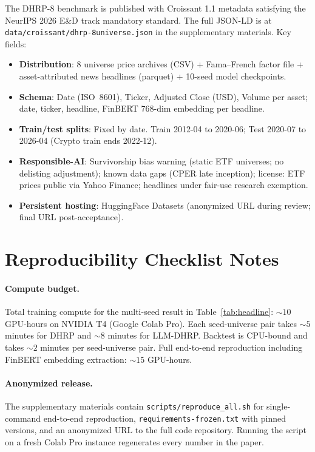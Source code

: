 The DHRP-8 benchmark is published with Croissant 1.1 metadata
\citep{Akhtar2024Croissant} satisfying the NeurIPS 2026 E\&D track
mandatory standard. The full JSON-LD is at
\texttt{data/croissant/dhrp-8universe.json} in the supplementary
materials. Key fields:
\begin{itemize}\itemsep0.05em
  \item \textbf{Distribution}: 8 universe price archives (CSV) +
    Fama--French factor file + asset-attributed news headlines
    (parquet) + 10-seed model checkpoints.
  \item \textbf{Schema}: Date (ISO~8601), Ticker, Adjusted Close (USD),
    Volume per asset; date, ticker, headline, FinBERT 768-dim
    embedding per headline.
  \item \textbf{Train/test splits}: Fixed by date. Train 2012-04 to
    2020-06; Test 2020-07 to 2026-04 (Crypto train ends 2022-12).
  \item \textbf{Responsible-AI}: Survivorship bias warning (static ETF
    universes; no delisting adjustment); known data gaps (CPER late
    inception); license: ETF prices public via Yahoo Finance;
    headlines under fair-use research exemption.
  \item \textbf{Persistent hosting}: HuggingFace Datasets
    (anonymized URL during review; final URL post-acceptance).
\end{itemize}

\section{Reproducibility Checklist Notes}
\label{app:repro_notes}

\paragraph{Compute budget.} Total training compute for the multi-seed
result in Table~\ref{tab:headline}: $\sim 10$ GPU-hours on NVIDIA T4
(Google Colab Pro). Each seed-universe pair takes $\sim 5$ minutes for
DHRP and $\sim 8$ minutes for LLM-DHRP. Backtest is CPU-bound and
takes $\sim 2$ minutes per seed-universe pair. Full end-to-end
reproduction including FinBERT embedding extraction: $\sim 15$
GPU-hours.

\paragraph{Anonymized release.} The supplementary materials contain
\texttt{scripts/reproduce\_all.sh} for single-command end-to-end
reproduction, \texttt{requirements-frozen.txt} with pinned versions,
and an anonymized URL to the full code repository. Running the script
on a fresh Colab Pro instance regenerates every number in the paper.
